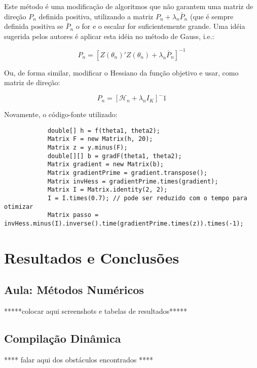 \documentclass{abnt}
\newenvironment{mylisting}
{\begin{list}{}{\setlength{\leftmargin}{1em}}\item\scriptsize\bfseries}
{\end{list}}
\begin{document}
Este método é uma modificação de algoritmos que não garantem uma matriz de direção $P_n$ definida positiva, utilizando a matriz $P_n + \lambda_n\bar P_n$ (que é sempre definida positiva se $\bar P_n$ o for e o escalar for suficientemente grande. Uma idéia sugerida pelos autores é aplicar esta idéia no método de Gauss, i.e.:

\[ P_n = [Z(\theta_n)'Z(\theta_n) + \lambda_n\bar P_n]^{-1} \]

Ou, de forma similar, modificar o Hessiano da função objetivo e usar, como matriz de direção:

\[ P_n = [\mathcal{H}_n+\lambda_nI_K]^-1 \]

Novamente, o código-fonte utilizado:

\begin{mylisting}
\begin{verbatim}
			double[] h = f(theta1, theta2);
			Matrix F = new Matrix(h, 20);
			Matrix z = y.minus(F);
			double[][] b = gradF(theta1, theta2);
			Matrix gradient = new Matrix(b);
			Matrix gradientPrime = gradient.transpose();
			Matrix invHess = gradientPrime.times(gradient);
			Matrix I = Matrix.identity(2, 2);
			I = I.times(0.7); // pode ser reduzido com o tempo para otimizar
			Matrix passo = invHess.minus(I).inverse().time(gradientPrime.times(z)).times(-1);
\end{verbatim}
\end{mylisting}


\chapter {Resultados e Conclusões}

\section{Aula: Métodos Numéricos}

*****colocar aqui screenshots e tabelas de resultados*****

\section{Compilação Dinâmica}

**** falar aqui dos obstáculos encontrados ****

\end{document}
